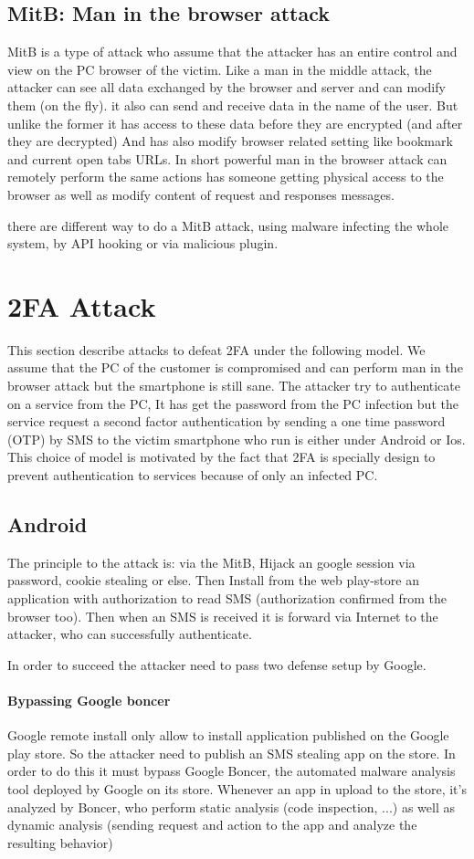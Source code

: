 \documentclass[11pt, a4paper,twocolumn]{article}
\begin{document}
\subsection{MitB: Man in the browser attack}
MitB is a type of attack who assume that the attacker has an entire control and view on the PC browser of the victim. Like a man in the middle attack, the attacker can see all data 
exchanged by the browser and server and can modify them (on the fly). it also can send and receive data in the name of the user. But unlike the former it has access to these data before they are encrypted (and after they are decrypted) And has also modify browser related setting like bookmark and current open tabs URLs. In short powerful man in the browser attack can remotely perform the same actions has someone getting physical access to the browser as well as modify content of request and responses messages.

there are different way to do a MitB attack, using malware infecting the whole system, by API hooking or via malicious plugin.


\section{2FA Attack}
 This section describe attacks to defeat 2FA under the following model. We assume that the PC of the customer is compromised and can perform man in the browser attack but the smartphone is still sane. The attacker try to authenticate on a service from the PC, It has get the password from the PC infection but the service request a second factor authentication by sending a one time password (OTP) by SMS to the victim smartphone who run is either under Android or Ios. 
This choice of model is motivated by the fact that 2FA is specially design to prevent authentication to services because of only an infected PC.
\subsection{Android}
The principle to the attack is: via the MitB, Hijack an google session via password, cookie stealing or else. Then Install from the web play-store an application with authorization to read SMS (authorization confirmed from the browser too). Then when an SMS is received it is forward via Internet to the attacker, who can successfully authenticate.

In order to succeed the attacker need to pass two defense setup by Google.

\paragraph{Bypassing Google boncer} Google remote install only allow to install application published on the Google play store. So the attacker need to publish an SMS stealing app on the store. In order to do this it must bypass Google Boncer, the automated malware analysis tool deployed by Google on its store. Whenever an app in upload to the store, it's analyzed by Boncer, who perform static analysis (code inspection, ...) as well as dynamic analysis (sending request and action to the app and analyze the resulting behavior)
\end{document}
